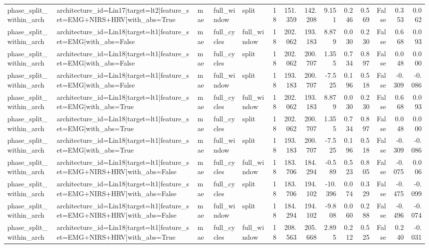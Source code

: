 \begin{table}
\begin{tabular}{lllllrrrrrrrrr}
phase_split_within_arch & architecture_id=Lin17|target=lt2|feature_set=EMG+NIRS+HRV|with_abs=True & mae & full_window & split & 18 & 151.359 & 142.208 & 9.151 & 0.246 & 0.569 & False & 0.353 & 0.062 \\
phase_split_within_arch & architecture_id=Lin18|target=lt1|feature_set=EMG|with_abs=False & mae & full_cycles & full_window & 18 & 202.062 & 193.183 & 8.879 & 0.030 & 0.230 & False & 0.668 & 0.093 \\
phase_split_within_arch & architecture_id=Lin18|target=lt1|feature_set=EMG|with_abs=False & mae & full_cycles & split & 18 & 202.062 & 200.707 & 1.355 & 0.734 & 0.897 & False & 0.048 & 0.000 \\
phase_split_within_arch & architecture_id=Lin18|target=lt1|feature_set=EMG|with_abs=False & mae & full_window & split & 18 & 193.183 & 200.707 & -7.525 & 0.196 & 0.518 & False & -0.309 & -0.086 \\
phase_split_within_arch & architecture_id=Lin18|target=lt1|feature_set=EMG|with_abs=True & mae & full_cycles & full_window & 18 & 202.062 & 193.183 & 8.879 & 0.030 & 0.230 & False & 0.668 & 0.093 \\
phase_split_within_arch & architecture_id=Lin18|target=lt1|feature_set=EMG|with_abs=True & mae & full_cycles & split & 18 & 202.062 & 200.707 & 1.355 & 0.734 & 0.897 & False & 0.048 & 0.000 \\
phase_split_within_arch & architecture_id=Lin18|target=lt1|feature_set=EMG|with_abs=True & mae & full_window & split & 18 & 193.183 & 200.707 & -7.525 & 0.196 & 0.518 & False & -0.309 & -0.086 \\
phase_split_within_arch & architecture_id=Lin18|target=lt1|feature_set=EMG+NIRS+HRV|with_abs=False & mae & full_cycles & full_window & 18 & 183.706 & 184.294 & -0.589 & 0.523 & 0.805 & False & -0.075 & 0.006 \\
phase_split_within_arch & architecture_id=Lin18|target=lt1|feature_set=EMG+NIRS+HRV|with_abs=False & mae & full_cycles & split & 18 & 183.706 & 194.102 & -10.396 & 0.074 & 0.329 & False & -0.475 & -0.099 \\
phase_split_within_arch & architecture_id=Lin18|target=lt1|feature_set=EMG+NIRS+HRV|with_abs=False & mae & full_window & split & 18 & 184.294 & 194.102 & -9.808 & 0.060 & 0.288 & False & -0.496 & -0.074 \\
phase_split_within_arch & architecture_id=Lin18|target=lt1|feature_set=EMG+NIRS+HRV|with_abs=True & mae & full_cycles & full_window & 18 & 208.563 & 205.668 & 2.895 & 0.212 & 0.525 & False & 0.240 & -0.031 \\

\end{tabular}
\end{table}
